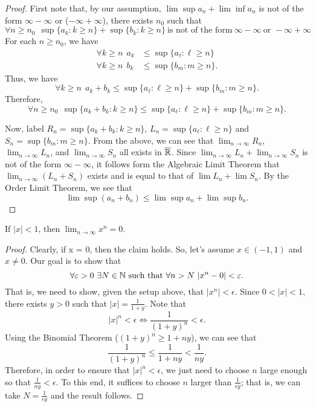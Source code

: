 \documentclass[a4paper]{article}
\begin{document}
\begin{proof}
First note that, by our assumption, \( \lim \sup {a}_{n} + \lim \inf {a}_{n} \) is not of the form \( \infty  - \infty   \) or (\( - \infty  + \infty   \)), there exists \( {n}_{0} \) such that 
\[  \forall n \geq {n}_{0} \ \ \sup \{ {a}_{k } : k \geq n   \}  + \sup \{ {b}_{k } : k \geq n   \}  \ \text{is not of the form} \ \infty  - \infty \  \text{or }  - \infty  + \infty   \]
For each \( n \geq {n}_{0} \), we have 
\begin{align*}
    \forall k \geq n \ \  {a}_{k } &\leq \sup \{ {a}_{\ell} : \ell \geq n  \}  \\
    \forall k \geq n \ \ {b}_{k } &\leq \sup \{ {b}_{m} : m \geq n  \}.
\end{align*}
Thus, we have 
\[  \forall k \geq n \ \ {a}_{k } + {b}_{k } \leq \sup \{ {a}_{\ell} : \ell \geq n  \}  + \sup \{ {b}_{m} : m \geq n \}.  \]
Therefore, 
\[  \forall n \geq {n}_{0} \ \ \sup \{ {a}_{k } + {b}_{k } : k \geq n  \}  \leq \sup \{ {a}_{\ell} : \ell \geq n  \}  + \sup \{ {b}_{m} : m \geq n  \}.  \]

Now, label \( {R}_{n} = \sup \{ {a}_{k } + {b}_{k } : k \geq n  \}  \), \( {L}_{n} = \sup \{ {a}_{\ell } : \ell \geq n  \}  \) and \( {S}_{n} = \sup \{ {b}_{m} : m \geq n  \}  \). From the above, we can see that \( \lim_{ n \to \infty  }  {R}_{n} \), \( \lim_{ n \to \infty  } {L}_{n} \), and \( \lim_{ n \to \infty  }  {S}_{n} \) all exists in \( \overline{\mathbb{R}} \). Since \( \lim_{ n \to \infty  } {L}_{n} + \lim_{ n \to \infty  } {S}_{n} \) is not of the form \( \infty  - \infty   \), it follows form the Algebraic Limit Theorem that \( \lim_{ n \to \infty  }  ({L}_{n} + {S}_{n}) \) exists and is equal to that of \(\lim {L}_{n} + \lim {S}_{n} \). By the Order Limit Theorem, we see that 
\[  \lim \sup ({a}_{n} + {b}_{n}) \leq \lim \sup {a}_{n} + \lim \sup {b}_{n}. \]

\end{proof}

\begin{theorem}[(e)]
    If \( | x |  < 1  \), then \( \lim_{ n \to \infty  } x^{n} = 0  \).
\end{theorem}
\begin{proof}
Clearly, if x = 0, then the claim holds. So, let's assume \( x \in (-1,1) \) and \( x \neq 0  \). Our goal is to show that 
\[  \forall \varepsilon > 0 \ \exists N \in \mathbb{N} \ \text{such that} \ \forall n > N \ | x^{n} - 0  |  < \varepsilon. \]
That is, we need to show, given the setup above, that \( | x^{n} |  < \epsilon \). Since \( 0 < | x  |  < 1  \), there exists \( y > 0  \) such that \( | x  |  = \frac{ 1 }{  1 + y }  \). Note that 
\[  | x |^{n} < \epsilon \iff \frac{ 1 }{  (1+y)^{n}  }  < \epsilon. \]
Using the Binomial Theorem (\( (1+y)^{n} \geq 1  + ny \)), we can see that  
\[  \frac{ 1  }{ (1+y)^{n} } \leq \frac{ 1  }{  1 + ny }  < \frac{ 1 }{ n y }.  \]
Therefore, in order to ensure that \( | x |^{n} < \epsilon \), we just need to choose \( n  \) large enough so that \( \frac{ 1 }{ ny }  < \epsilon \). To this end, it suffices to choose \( n  \) larger than \( \frac{ 1  }{ \epsilon y }  \); that is, we can take \( N = \frac{ 1  }{  \epsilon y  }\) and the result follows.
\end{proof}
\end{document}
